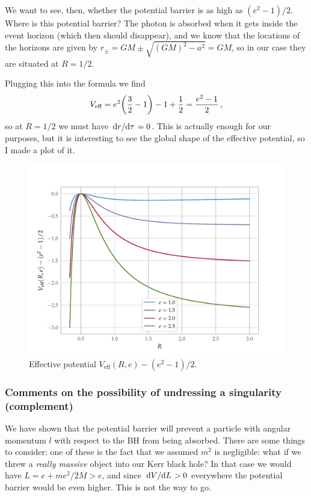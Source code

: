 \documentclass[main.tex]{subfiles}
\begin{document}
We want to see, then, whether the potential barrier is as high as \((e^2- 1) /2\). Where is this potential barrier? 
The photon is absorbed when it gets inside the event horizon (which then should disappear), and we know that the locations of the horizons are given by \(r_{\pm} = GM \pm \sqrt{(GM)^2 - a^2} = GM\), so in our case they are situated at \(R = 1/2\). 

Plugging this into the formula we find 
%
\begin{align}
  V _{\text{eff}} = e^2 \qty(\frac{3}{2} - 1) - 1 + \frac{1}{2} = \frac{e^2 -1}{2}
\,,
\end{align}
%
so at \(R = 1/2\) we must have \(\dv*{r}{\tau } = 0\).
This is actually enough for our purposes, but it is interesting to see the global shape of the effective potential, so I made a plot of it. 

\begin{figure}[ht]
  \centering
  \includegraphics[width=\textwidth]{figures/potential_barrier}
  \caption{Effective potential \(V _{\text{eff}} (R, e) - (e^2 -1) / 2\).}
  \label{fig:residual-potential}
\end{figure}

\subsubsection{Comments on the possibility of undressing a singularity (complement)}

We have shown that the potential barrier will prevent a particle with angular momentum \(l\) with respect to the BH from being absorbed. 
There are some things to consider: one of these is the fact that we assumed \(m^2\) is negligible: what if we threw a \emph{really massive} object into our Kerr black hole?
In that case we would have \(L = e + m e^2 / 2M > e\), and since \(\dv*{V}{L} > 0\) everywhere the potential barrier would be even higher. This is not the way to go. 
\end{document}
